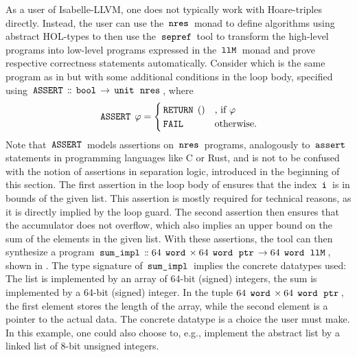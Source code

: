 As a user of Isabelle-LLVM, one does not typically work with Hoare-triples directly.
Instead, the user can use the $\,\text{\ttfamily nres}\,$ monad to define algorithms using abstract HOL-types to then use the $\,\text{\ttfamily sepref}\,$ tool to transform the high-level programs into low-level programs expressed in the $\,\text{\ttfamily llM}\,$ monad and prove respective correctness statements automatically.
Consider  which is the same program as in  but with some additional conditions in the loop body, specified using $\,\text{\ttfamily ASSERT}\, \mathrel{\mathord{:}\mkern-1.2mu\mathord{:}} \,\text{\ttfamily bool}\, \rightarrow \,\text{\ttfamily unit}\, \; \,\text{\ttfamily nres}\,$, where
\begin{gather*}
	\,\text{\ttfamily ASSERT}\, \; \varphi =
	\begin{cases}
		\,\text{\ttfamily RETURN}\, \; () & \text{, if $\varphi$} \\
		\,\text{\ttfamily FAIL}\,           & \text{otherwise.}
	\end{cases}
\end{gather*}
Note that $\,\text{\ttfamily ASSERT}\,$ models assertions on $\,\text{\ttfamily nres}\,$ programs, analogously to $\,\text{\ttfamily assert}\,$ statements in programming languages like C or Rust, and is not to be confused with the notion of assertions in separation logic, introduced in the beginning of this section.
The first assertion in the loop body of  ensures that the index $\,\text{\ttfamily i}\,$ is in bounds of the given list.
This assertion is mostly required for technical reasons, as it is directly implied by the loop guard.
The second assertion then ensures that the accumulator does not overflow, which also implies an upper bound on the sum of the elements in the given list.
With these assertions, the  tool can then synthesize a program $\,\text{\ttfamily sum\_impl}\, \mathrel{\mathord{:}\mkern-1.2mu\mathord{:}} 64 \; \,\text{\ttfamily word}\, \times 64 \; \,\text{\ttfamily word}\, \; \,\text{\ttfamily ptr}\, \rightarrow 64 \; \,\text{\ttfamily word}\, \; \,\text{\ttfamily llM}\,$, shown in .
The type signature of $\,\text{\ttfamily sum\_impl}\,$ implies the concrete datatypes used: The list is implemented by an array of 64-bit (signed) integers, the sum is implemented by a 64-bit (signed) integer.
In the tuple $64 \; \,\text{\ttfamily word}\, \times 64 \; \,\text{\ttfamily word}\, \; \,\text{\ttfamily ptr}\,$, the first element stores the length of the array, while the second element is a pointer to the actual data.
The concrete datatype is a choice the user must make.
In this example, one could also choose to, e.g., implement the abstract list by a linked list of 8-bit unsigned integers.

